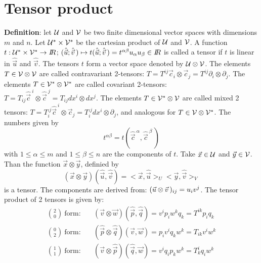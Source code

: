 \documentclass[twoside]{report}
\begin{document}
\section{Tensor product}
{\bf Definition}: let $\cal U$ and $\cal V$ be two finite dimensional vector
spaces with dimensions $m$ and $n$. Let $\cal U^*\times V^*$ be the cartesian
product of $\cal U$ and $\cal V$. A function $t:{\cal U^*\times V^*}\rightarrow I\hspace{-1mm}R$;
$(\hat{\vec{u}};\hat{\vec{v}}\,)\mapsto t(\hat{\vec{u}};\hat{\vec{v}}\,)=t^{\alpha\beta}u_\alpha u_\beta\in I\hspace{-1mm}R$
is called a tensor if $t$ is linear in $\hat{\vec{u}}$ and $\hat{\vec{v}}$.
The tensors $t$ form a vector space denoted by $\cal U\otimes V$.
The elements $T\in\cal V\otimes V$ are called contravariant 2-tensors:
$T=T^{ij}\vec{c}_i\otimes\vec{c}_j=T^{ij}\partial_i\otimes\partial_j$. The
elements $T\in\cal V^*\otimes V^*$ are called covariant 2-tensors:
$T=T_{ij}\hat{\vec{c}}^{~i}\otimes\hat{\vec{c}}^{~j}=T_{ij}dx^i\otimes dx^j$.
The elements $T\in\cal V^*\otimes V$ are called mixed 2 tensors:
$T=T_i^{.j}\hat{\vec{c}}^{~i}\otimes\vec{c}_j=T_i^{.j}dx^i\otimes\partial_j$,
and analogous for $T\in\cal V\otimes V^*$.
\npar
The numbers given by
\[
t^{\alpha\beta}=t(\hat{\vec{c}}^{~\alpha},\hat{\vec{c}}^{~\beta}\,)
\]
with $1\leq\alpha\leq m$ and $1\leq\beta\leq n$ are the components of $t$.
\npar
Take $\vec{x}\in\cal U$ and $\vec{y}\in\cal V$. Than the function
$\vec{x}\otimes\vec{y}$, definied by
\[
(\vec{x}\otimes\vec{y})(\hat{\vec{u}},\hat{\vec{v}})=<\vec{x},\hat{\vec{u}}>_U<\vec{y},\hat{\vec{v}}>_V
\]
is a tensor. The components are derived from: $(\vec{u}\otimes\vec{v}\,)_{ij}=u_iv^j$.
The tensor product of 2 tensors is given by:
\begin{eqnarray*}
{2\choose0}~\mbox{form:}~&&(\vec{v}\otimes\vec{w})(\hat{\vec{p}},\hat{\vec{q}})=v^ip_iw^kq_k=T^{ik}p_iq_k\\
{0\choose2}~\mbox{form:}~&&(\hat{\vec{p}}\otimes\hat{\vec{q}})(\vec{v},\vec{w})=p_iv^iq_kw^k=T_{ik}v^iw^k\\
{1\choose1}~\mbox{form:}~&&(\vec{v}\otimes\hat{\vec{p}})(\hat{\vec{q}},\vec{w})=v^iq_ip_kw^k=T_k^iq_iw^k
\end{eqnarray*}
\end{document}
